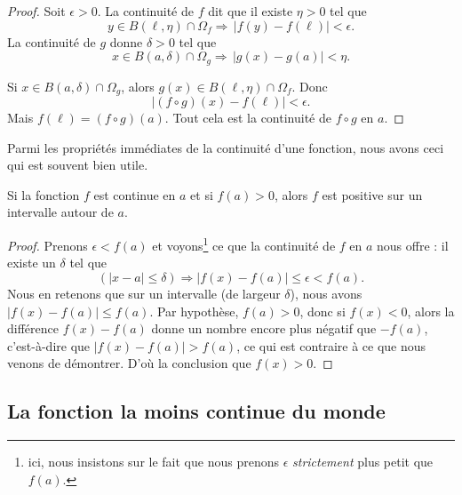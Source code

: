 \begin{proof}
    Soit \( \epsilon>0\). La continuité de \( f\) dit que il existe \( \eta>0\) tel que
    \begin{equation}
        y\in B(\ell,\eta)\cap\Omega_f\Rightarrow\,| f(y)-f(\ell) |<\epsilon.
    \end{equation}
    La continuité de \( g\) donne \( \delta>0\) tel que
    \begin{equation}
        x\in B(a,\delta)\cap\Omega_g\Rightarrow\,| g(x)-g(a) |<\eta.
    \end{equation}

    Si \( x\in B(a,\delta)\cap\Omega_g\), alors \( g(x)\in B(\ell,\eta)\cap\Omega_f\). Donc
    \begin{equation}
        | (f\circ g)(x)-f(\ell) |<\epsilon.
    \end{equation}
    Mais \( f(\ell)=(f\circ g)(a)\). Tout cela est la continuité de \( f\circ g\) en \( a\).
\end{proof}


Parmi les propriétés immédiates de la continuité d'une fonction, nous avons ceci qui est souvent bien utile.

\begin{corollary}   \label{CorNNPYooMbaYZg}
Si la fonction $f$ est continue en $a$ et si $f(a)>0$, alors $f$ est positive sur un intervalle autour de $a$.
\end{corollary}

\begin{proof}
Prenons $\epsilon<f(a)$ et voyons\footnote{ici, nous insistons sur le fait que nous prenons $\epsilon$ \emph{strictement} plus petit que $f(a)$.} ce que la continuité de $f$ en $a$ nous offre : il existe un $\delta$ tel que
\[
  (| x-a |\leq \delta)\Rightarrow | f(x)-f(a) |\leq\epsilon < f(a).
\]
Nous en retenons que sur un intervalle (de largeur $\delta$), nous avons $| f(x)-f(a) |\leq f(a)$. Par hypothèse, $f(a)>0$, donc si $f(x)<0$, alors la différence $f(x)-f(a)$ donne un nombre encore plus négatif que $-f(a)$, c'est-à-dire que $| f(x)-f(a) |>f(a)$, ce qui est contraire à ce que nous venons de démontrer. D'où la conclusion que $f(x)>0$.
\end{proof}

\subsection{La fonction la moins continue du monde}

